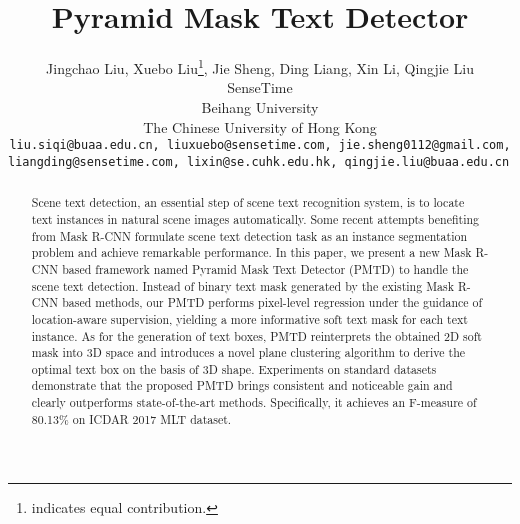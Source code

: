 \documentclass[10pt,twocolumn,letterpaper]{article}
\begin{document}
    \title{\vspace{-1.5cm}Pyramid Mask Text Detector\vspace{-0.5cm}}
    \author{
    Jingchao Liu, Xuebo Liu\thanks{ indicates equal contribution.}, Jie Sheng, Ding Liang, Xin Li, Qingjie Liu\\
    SenseTime\\
    Beihang University\\
    The Chinese University of Hong Kong\\
    \tt\small liu.siqi@buaa.edu.cn, liuxuebo@sensetime.com, jie.sheng0112@gmail.com,\\
    \tt\small liangding@sensetime.com, lixin@se.cuhk.edu.hk, qingjie.liu@buaa.edu.cn
    }

    \maketitle


    \begin{abstract}
        Scene text detection, an essential step of scene text recognition system, is to locate text instances in natural scene images automatically. Some recent attempts benefiting from Mask R-CNN formulate scene text detection task as an instance segmentation problem and achieve remarkable performance. In this paper, we present a new Mask R-CNN based framework named Pyramid Mask Text Detector (PMTD) to handle the scene text detection. Instead of binary text mask generated by the existing Mask R-CNN based methods, our PMTD performs pixel-level regression under the guidance of location-aware supervision, yielding a more informative soft text mask for each text instance. As for the generation of text boxes, PMTD reinterprets the obtained 2D soft mask into 3D space and introduces a novel plane clustering algorithm to derive the optimal text box on the basis of 3D shape. Experiments on standard datasets demonstrate that the proposed PMTD brings consistent and noticeable gain and clearly outperforms state-of-the-art methods. Specifically, it achieves an F-measure of 80.13\% on ICDAR 2017 MLT dataset.
    \end{abstract}
\end{document}
